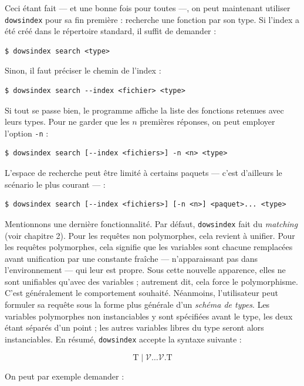 \documentclass[a4paper]{report}
\theoremstyle{definition}
\newcommand{\dowsindex}{\texttt{dowsindex}\xspace}
\newcommand{\V}{\mathscr{V}}
\newcommand{\T}{\mathrm{T}}
\begin{document}
{Ceci étant fait — et une bonne fois pour toutes —, on peut maintenant utiliser \dowsindex pour sa fin première : recherche une fonction par son type. Si l'index a été créé dans le répertoire standard, il suffit de demander :

\begin{verbatim}
$ dowsindex search <type>
\end{verbatim}

Sinon, il faut préciser le chemin de l'index :

\begin{verbatim}
$ dowsindex search --index <fichier> <type>
\end{verbatim}

Si tout se passe bien, le programme affiche la liste des fonctions retenues avec leurs types. Pour ne garder que les $n$ premières réponses, on peut employer l'option \texttt{-n} :

\begin{verbatim}
$ dowsindex search [--index <fichiers>] -n <n> <type>
\end{verbatim}

L'espace de recherche peut être limité à certains paquets — c'est d'ailleurs le scénario le plus courant — :

\begin{verbatim}
$ dowsindex search [--index <fichiers>] [-n <n>] <paquet>... <type>
\end{verbatim}

Mentionnons une dernière fonctionnalité. Par défaut, \dowsindex fait du \emph{matching} (voir chapitre 2). Pour les requêtes non polymorphes, cela revient à unifier. Pour les requêtes polymorphes, cela signifie que les variables sont chacune remplacées avant unification par une constante fraîche — n'apparaissant pas dans l'environnement — qui leur est propre. Sous cette nouvelle apparence, elles ne sont unifiables qu'avec des variables ; autrement dit, cela force le polymorphisme. C'est généralement le comportement souhaité. Néanmoins, l'utilisateur peut formuler sa requête sous la forme plus générale d'un \emph{schéma de types}. Les variables polymorphes non instanciables y sont spécifiées avant le type, les deux étant séparés d'un point ; les autres variables libres du type seront alors instanciables. En résumé, \dowsindex accepte la syntaxe suivante :

\[ \T \mid \V \dots \V \texttt{.} \T \]

On peut par exemple demander :

}
\end{document}
